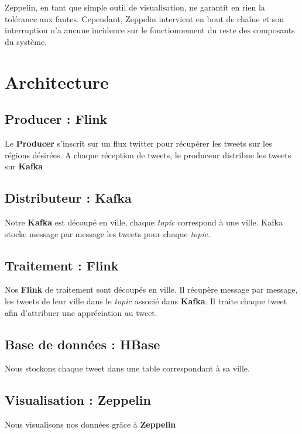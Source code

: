 \documentclass[a4paper,oneside,11pt]{article}
\begin{document}
Zeppelin, en tant que simple outil de visualisation, ne garantit en rien la tolérance aux fautes. Cependant, Zeppelin intervient en bout de chaîne et son interruption n'a aucune incidence sur le fonctionnement du reste des composants du système. 


\section{Architecture}

\subsection{Producer : Flink}

Le \textbf{Producer} s'inscrit sur un flux twitter pour récupérer les tweets sur les régions désirées. A chaque réception de tweets, le produceur distribue les tweets sur \textbf{Kafka}

\subsection{Distributeur : Kafka}

Notre \textbf{Kafka} est découpé en ville, chaque \textit{topic} correspond à une ville. Kafka stocke message par message les tweets pour chaque \textit{topic}. 

\subsection{Traitement : Flink}

Nos \textbf{Flink} de traitement sont découpés en ville. Il récupère message par message, les tweets de leur ville dans le \textit{topic} associé dans \textbf{Kafka}. Il traite chaque tweet afin d'attribuer une appréciation au tweet. 

\subsection{Base de données : HBase}

Nous stockons chaque tweet dans une table correspondant à sa ville. 


\subsection{Visualisation : Zeppelin}

Nous visualisons nos données grâce à \textbf{Zeppelin}
\end{document}
